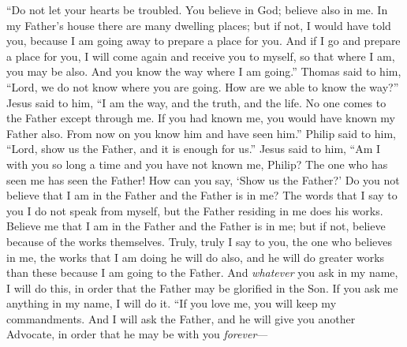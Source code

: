 \begin{biblechapter} %
 “Do not let your hearts be troubled. You believe in God; believe also in me.
\verse In my Father’s house there are many dwelling places; but if not, I would have told you, because I am going away to prepare a place for you.
\verse And if I go and prepare a place for you, I will come again and receive you to myself, so that where I am, you may be also.
\verse And you know the way where I am going.”
\verse Thomas said to him, “Lord, we do not know where you are going. How are we able to know the way?”
\verse Jesus said to him, “I am the way, and the truth, and the life. No one comes to the Father except through me.
\verse If you had known me, you would have known my Father also. From now on you know him and have seen him.”
\verse Philip said to him, “Lord, show us the Father, and it is enough for us.”
\verse Jesus said to him, “Am I with you so long a time and you have not known me, Philip? The one who has seen me has seen the Father! How can you say, ‘Show us the Father?’
\verse Do you not believe that I am in the Father and the Father is in me? The words that I say to you I do not speak from myself, but the Father residing in me does his works.
\verse Believe me that I am in the Father and the Father is in me; but if not, believe because of the works themselves.
\verse Truly, truly I say to you, the one who believes in me, the works that I am doing he will do also, and he will do greater works than these because I am going to the Father.
\verse And \textit{whatever} you ask in my name, I will do this, in order that the Father may be glorified in the Son.
\verse If you ask me anything in my name, I will do it.
 “If you love me, you will keep my commandments.
\verse And I will ask the Father, and he will give you another Advocate, in order that he may be with you \textit{forever}—

\end{biblechapter}
